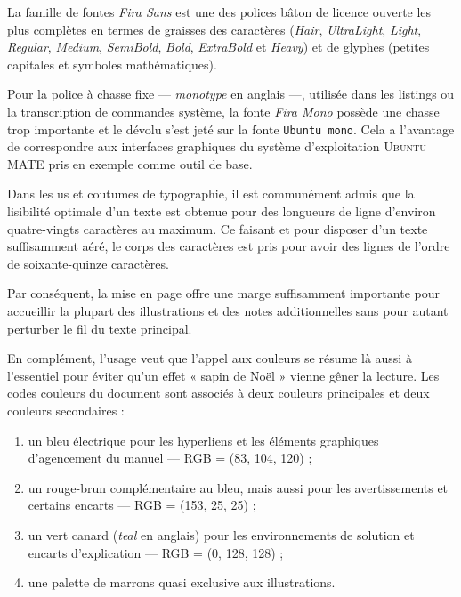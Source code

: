 La famille de fontes \textit{Fira Sans} est une des polices bâton de licence ouverte les plus complètes en termes de graisses des caractères (\textit{Hair}, \textit{UltraLight}, \textit{Light}, \textit{Regular}, \textit{Medium}, \textit{SemiBold}, \textit{Bold}, \textit{ExtraBold} et \textit{Heavy}) et de glyphes (petites capitales et symboles mathématiques).

Pour la police à chasse fixe --- \textit{monotype} en anglais ---, utilisée dans les listings ou la transcription de commandes système, la fonte \textit{Fira Mono} possède une chasse trop importante et le dévolu s'est jeté sur la fonte \texttt{Ubuntu mono}. Cela a l'avantage de correspondre aux interfaces graphiques du système d'exploitation \textsc{Ubuntu MATE} pris en exemple comme outil de base.

Dans les us et coutumes de typographie, il est communément admis que la lisibilité optimale d'un texte est obtenue pour des longueurs de ligne d'environ quatre-vingts caractères au maximum. Ce faisant et pour disposer d'un texte suffisamment aéré, le corps des caractères est pris pour avoir des lignes de l'ordre de soixante-quinze caractères. 

Par conséquent, la mise en page offre une marge suffisamment importante pour accueillir la plupart des illustrations et des notes additionnelles sans pour autant perturber le fil du texte principal.

En complément, l'usage veut que l'appel aux couleurs se résume là aussi à l'essentiel pour éviter qu'un effet « sapin de Noël » vienne gêner la lecture. Les codes couleurs du document sont associés à deux couleurs principales et deux couleurs secondaires :
\begin{enumerate}
\item un \textcolor{firstcolor}{bleu électrique} pour les hyperliens et les éléments graphiques d'agencement du manuel --- RGB = (83, 104, 120) ;
\item un \textcolor{secondcolor}{rouge-brun} complémentaire au bleu, mais aussi pour les avertissements et certains encarts --- RGB = (153, 25, 25) ;
\item un \textcolor{thirdcolor}{vert canard} (\textit{teal} en anglais) pour les environnements de solution et encarts d'explication --- RGB = (0, 128, 128) ;
\item une \textcolor{fourthcolor}{palette de marrons} quasi exclusive aux illustrations.
\end{enumerate}

